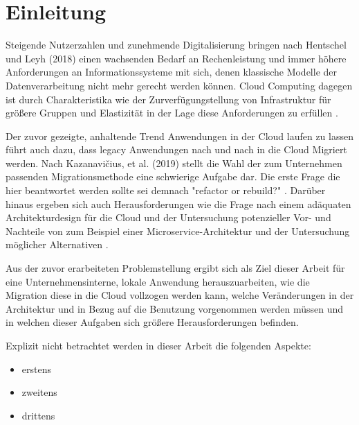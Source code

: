 
\chapter{Einleitung}


Steigende Nutzerzahlen und zunehmende Digitalisierung bringen nach Hentschel und Leyh (2018) einen wachsenden Bedarf an Rechenleistung und immer höhere Anforderungen an Informationssysteme mit sich, denen klassische Modelle der Datenverarbeitung nicht mehr gerecht werden können. Cloud Computing dagegen ist durch Charakteristika wie der Zurverfügungstellung von Infrastruktur für größere Gruppen und Elastizität \cite[Vgl.][S. 2]{Mell2011} in der Lage diese Anforderungen zu erfüllen \cite[Vgl.][S. 6]{Reinheimer2018}.

Der zuvor gezeigte, anhaltende Trend Anwendungen in der Cloud laufen zu lassen führt auch dazu, dass legacy Anwendungen nach und nach in die Cloud Migriert werden. Nach Kazanavičius, et al. (2019) stellt die Wahl der zum Unternehmen passenden Migrationsmethode eine schwierige Aufgabe dar. Die erste Frage die hier beantwortet werden sollte sei demnach "refactor or rebuild?" \cite[Vgl.][S. 4]{Kazanavicius2019}. Darüber hinaus ergeben sich auch Herausforderungen wie die Frage nach einem adäquaten Architekturdesign für die Cloud \cite[Vgl.][S. 14]{Pahl} und der Untersuchung potenzieller Vor- und Nachteile
von zum Beispiel einer Microservice-Architektur und der Untersuchung möglicher Alternativen \cite[Vgl.][S. 3]{Carrasco2018}.

Aus der zuvor erarbeiteten Problemstellung ergibt sich als Ziel dieser Arbeit für eine Unternehmensinterne, lokale Anwendung herauszuarbeiten, wie die Migration diese in die Cloud vollzogen werden kann, welche Veränderungen in der Architektur und in Bezug auf die Benutzung vorgenommen werden müssen und in welchen dieser Aufgaben sich größere Herausforderungen befinden.

Explizit nicht betrachtet werden in dieser Arbeit die folgenden Aspekte:
\begin{itemize}
\item erstens
\item zweitens
\item drittens
\end{itemize}

\pagebreak



